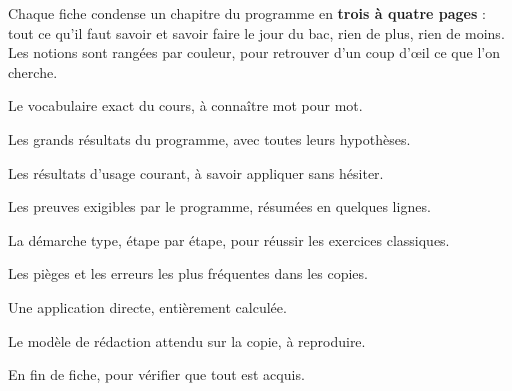 \thispagestyle{otFront}

{\fontsize{10.5}{14}\selectfont
Chaque fiche condense un chapitre du programme en \textbf{trois à quatre pages} : tout ce qu'il
faut savoir et savoir faire le jour du bac, rien de plus, rien de moins. Les notions sont rangées
par couleur, pour retrouver d'un coup d'œil ce que l'on cherche.\par}
\vspace{4mm}

\noindent
\begin{minipage}[t]{0.485\linewidth}
\begin{definition}
Le vocabulaire exact du cours, à connaître mot pour mot.
\end{definition}
\begin{theoreme}
Les grands résultats du programme, avec toutes leurs hypothèses.
\end{theoreme}
\begin{propriete}
Les résultats d'usage courant, à savoir appliquer sans hésiter.
\end{propriete}
\begin{demonstration}
Les preuves exigibles par le programme, résumées en quelques lignes.
\end{demonstration}
\end{minipage}\hfill
\begin{minipage}[t]{0.485\linewidth}
\begin{methode}
La démarche type, étape par étape, pour réussir les exercices classiques.
\end{methode}
\begin{attention}
Les pièges et les erreurs les plus fréquentes dans les copies.
\end{attention}
\begin{exemple}
Une application directe, entièrement calculée.
\end{exemple}
\begin{redaction}
Le modèle de rédaction attendu sur la copie, à reproduire.
\end{redaction}
\begin{tcolorbox}[otBase,colback=otNavy,colframe=otNavy,coltext=white]
\par\vspace{1.1mm}
En fin de fiche, pour vérifier que tout est acquis.
\end{tcolorbox}
\end{minipage}

